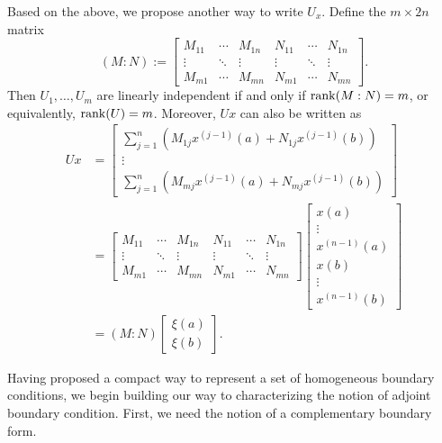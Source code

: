 \documentclass[12pt, oneside, a4paper]{article}
\begin{document}
Based on the above, we propose another way to write $U_x$. Define the $m\times 2n$ matrix
\[(M:N):=\begin{bmatrix}
    M_{11} & \cdots & M_{1n} & N_{11} & \cdots & N_{1n}\\
    \vdots & \ddots & \vdots & \vdots & \ddots & \vdots\\
    M_{m1} & \cdots & M_{mn} & N_{m1} & \cdots & N_{mn}
\end{bmatrix}.\]
Then $U_1,\ldots,U_m$ are linearly independent if and only if $\operatorname{rank}(M:N)=m$, or equivalently, $\operatorname{rank}(U)=m$. 
Moreover, $Ux$ can also be written as
\begin{align*}
    Ux &= \begin{bmatrix}
        \sum_{j=1}^n (M_{1j}x^{(j-1)}(a) + N_{1j}x^{(j-1)}(b))\\
        \vdots\\
        \sum_{j=1}^n (M_{mj}x^{(j-1)}(a) + N_{mj}x^{(j-1)}(b))
    \end{bmatrix}\\
    &= \begin{bmatrix}
        M_{11} & \cdots & M_{1n} & N_{11} & \cdots & N_{1n}\\
        \vdots & \ddots & \vdots & \vdots & \ddots & \vdots\\
        M_{m1} & \cdots & M_{mn} & N_{m1} & \cdots & N_{mn}
    \end{bmatrix} \begin{bmatrix}x(a)\\\vdots\\x^{(n-1)}(a)\\ x(b)\\\vdots\\x^{(n-1)}(b)\end{bmatrix}\\
    &= (M:N)\begin{bmatrix}
        \xi(a)\\
        \xi(b)
    \end{bmatrix}.
\end{align*}

Having proposed a compact way to represent a set of homogeneous boundary conditions, we begin building our way to characterizing the notion of adjoint boundary condition. First, we need the notion of a complementary boundary form.
\end{document}
